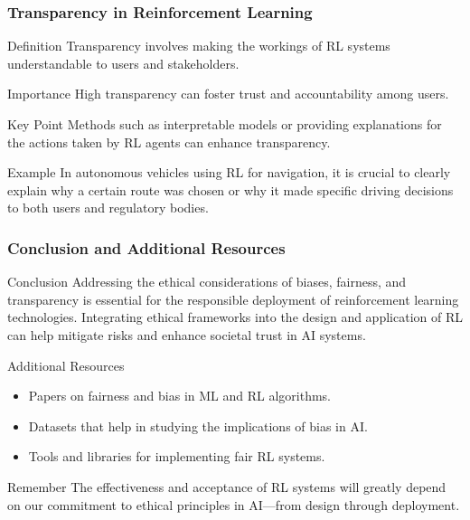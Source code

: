 \documentclass{beamer}
\begin{document}
\begin{frame}[fragile]
    \frametitle{Transparency in Reinforcement Learning}
    \begin{block}{Definition}
        Transparency involves making the workings of RL systems understandable to users and stakeholders.
    \end{block}
    \begin{block}{Importance}
        High transparency can foster trust and accountability among users.
    \end{block}
    \begin{block}{Key Point}
        Methods such as interpretable models or providing explanations for the actions taken by RL agents can enhance transparency.
    \end{block}
    \begin{block}{Example}
        In autonomous vehicles using RL for navigation, it is crucial to clearly explain why a certain route was chosen or why it made specific driving decisions to both users and regulatory bodies.
    \end{block}
\end{frame}

\begin{frame}[fragile]
    \frametitle{Conclusion and Additional Resources}
    \begin{block}{Conclusion}
        Addressing the ethical considerations of biases, fairness, and transparency is essential for the responsible deployment of reinforcement learning technologies. Integrating ethical frameworks into the design and application of RL can help mitigate risks and enhance societal trust in AI systems.
    \end{block}
    \begin{block}{Additional Resources}
        \begin{itemize}
            \item Papers on fairness and bias in ML and RL algorithms.
            \item Datasets that help in studying the implications of bias in AI.
            \item Tools and libraries for implementing fair RL systems.
        \end{itemize}
    \end{block}
    \begin{block}{Remember}
        The effectiveness and acceptance of RL systems will greatly depend on our commitment to ethical principles in AI—from design through deployment.
    \end{block}
\end{frame}
\end{document}
